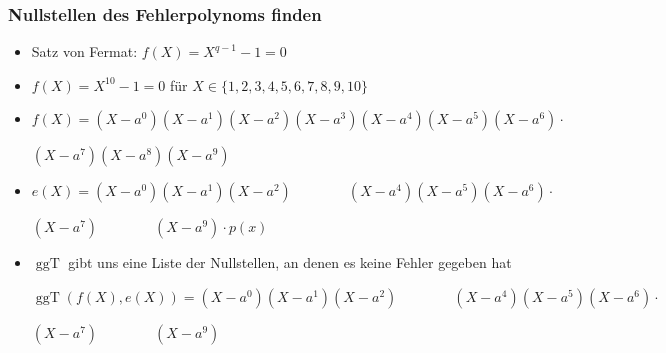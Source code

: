 \documentclass[11pt,aspectratio=169]{beamer}
\begin{document}
	\begin{frame}
		\frametitle{Nullstellen des Fehlerpolynoms finden}
		
		\begin{itemize}
			\item Satz von Fermat: $f(X) = X^{q-1}-1=0$
			
			\vspace{10pt}
			
			\item $f(X) = X^{10}-1 = 0$ \qquad für $X \in \{1,2,3,4,5,6,7,8,9,10\}$
			
			\vspace{10pt}
			
			\item $f(X) = (X-a^0)(X-a^1)(X-a^2)(X-a^3)(X-a^4)(X-a^5)(X-a^6) \cdot$
			
			\qquad \qquad $(X-a^7)(X-a^8)(X-a^9)$
			
			\vspace{10pt}
			
			\item $e(X) = (X-a^0)(X-a^1)(X-a^2) \qquad \qquad (X-a^4)(X-a^5)(X-a^6) \cdot$
			
			\qquad \qquad $(X-a^7) \qquad \qquad (X-a^9) \cdot p(x)$
			
			\vspace{10pt}
			
			\item $\operatorname{ggT}$ gibt uns eine Liste der Nullstellen, an denen es keine Fehler gegeben hat
			
			\vspace{10pt}
			
			$\operatorname{ggT}(f(X),e(X)) = (X-a^0)(X-a^1)(X-a^2) \qquad \qquad (X-a^4)(X-a^5)(X-a^6) \cdot$
			
			\qquad \qquad \qquad \qquad $(X-a^7) \qquad \qquad (X-a^9)$
				
		\end{itemize}
			
	\end{frame}
\end{document}
